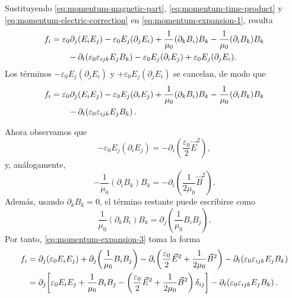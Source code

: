 \documentclass[12pt,a4paper]{article}
\theoremstyle{definition}
\theoremstyle{plain}
\numberwithin{equation}{section}
\theoremstyle{remark}
\newcommand{\E}{\vec{E}}
\newcommand{\B}{\vec{B}}
\begin{document}
Sustituyendo \eqref{eq:momentum-magnetic-part}, \eqref{eq:momentum-time-product} y \eqref{eq:momentum-electric-correction} en \eqref{eq:momentum-expansion-1}, resulta
\begin{align}
    f_i
    &=
    \varepsilon_0\partial_j(E_iE_j)
    -\varepsilon_0E_j(\partial_jE_i)
    +\frac{1}{\mu_0}(\partial_kB_i)B_k
    -\frac{1}{\mu_0}(\partial_iB_k)B_k \notag\\
    &\qquad
    -\partial_t\!\left(\varepsilon_0\varepsilon_{ijk}E_jB_k\right)
    -\varepsilon_0E_j(\partial_iE_j)
    +\varepsilon_0E_j(\partial_jE_i).
    \label{eq:momentum-expansion-2}
\end{align}
Los términos $-\varepsilon_0E_j(\partial_jE_i)$ y $+\varepsilon_0E_j(\partial_jE_i)$ se cancelan, de modo que
\begin{align}
    f_i
    &=
    \varepsilon_0\partial_j(E_iE_j)
    -\varepsilon_0E_j(\partial_iE_j)
    +\frac{1}{\mu_0}(\partial_kB_i)B_k
    -\frac{1}{\mu_0}(\partial_iB_k)B_k \notag\\
    &\qquad
    -\partial_t\!\left(\varepsilon_0\varepsilon_{ijk}E_jB_k\right).
    \label{eq:momentum-expansion-3}
\end{align}

Ahora observamos que
\begin{equation}
    -\varepsilon_0E_j(\partial_iE_j)
    =
    -\partial_i\!\left(\frac{\varepsilon_0}{2}\E^2\right),
    \label{eq:momentum-electric-gradient}
\end{equation}
y, análogamente,
\begin{equation}
    -\frac{1}{\mu_0}(\partial_iB_k)B_k
    =
    -\partial_i\!\left(\frac{1}{2\mu_0}\B^2\right).
    \label{eq:momentum-magnetic-gradient}
\end{equation}
Además, usando \(\partial_kB_k=0\), el término restante puede escribirse como
\begin{equation}
    \frac{1}{\mu_0}(\partial_kB_i)B_k
    =
    \partial_j\!\left(\frac{1}{\mu_0}B_iB_j\right).
    \label{eq:momentum-magnetic-divergence}
\end{equation}
Por tanto, \eqref{eq:momentum-expansion-3} toma la forma
\begin{align}
    f_i
    &=
    \partial_j\!\left(\varepsilon_0E_iE_j\right)
    +
    \partial_j\!\left(\frac{1}{\mu_0}B_iB_j\right)
    -
    \partial_i\!\left(
        \frac{\varepsilon_0}{2}\E^2
        +
        \frac{1}{2\mu_0}\B^2
    \right)
    -
    \partial_t\!\left(\varepsilon_0\varepsilon_{ijk}E_jB_k\right)
    \notag\\
    &=
    \partial_j\!\left[
        \varepsilon_0E_iE_j
        +
        \frac{1}{\mu_0}B_iB_j
        -
        \left(
            \frac{\varepsilon_0}{2}\E^2
            +
            \frac{1}{2\mu_0}\B^2
        \right)\delta_{ij}
    \right]
    -
    \partial_t\!\left(\varepsilon_0\varepsilon_{ijk}E_jB_k\right).
    \label{eq:momentum-balance-precompact}
\end{align}
\end{document}
